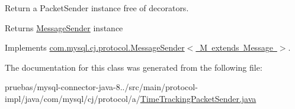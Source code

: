Return a Packet\+Sender instance free of decorators.

\begin{DoxyReturn}{Returns}
\mbox{\hyperlink{interfacecom_1_1mysql_1_1cj_1_1protocol_1_1_message_sender}{Message\+Sender}} instance 
\end{DoxyReturn}


Implements \mbox{\hyperlink{interfacecom_1_1mysql_1_1cj_1_1protocol_1_1_message_sender_a8066931f03c2fa9cc705716fa10a4517}{com.\+mysql.\+cj.\+protocol.\+Message\+Sender$<$ M extends Message $>$}}.



The documentation for this class was generated from the following file\+:\begin{DoxyCompactItemize}
\item 
pruebas/mysql-\/connector-\/java-\/8../src/main/protocol-\/impl/java/com/mysql/cj/protocol/a/\mbox{\hyperlink{_time_tracking_packet_sender_8java}{Time\+Tracking\+Packet\+Sender.\+java}}\end{DoxyCompactItemize}
